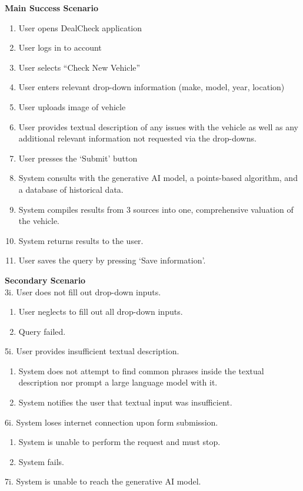 \documentclass[]{article}
\begin{document}
\begin{enumerate}[{\bf {BE}1.}]
	{\bf Main Success Scenario}
		\begin{enumerate}[1.]
			\item User opens DealCheck application
			\item User logs in to account
			\item User selects “Check New Vehicle”
			\item User enters relevant drop-down information (make, model, year, location)
			\item User uploads image of vehicle
			\item User provides textual description of any issues with the vehicle as well as any additional relevant information not requested via the drop-downs.
			\item User presses the ‘Submit’ button
			\item System consults with the generative AI model, a points-based algorithm, and a database of historical data.
			\item System compiles results from 3 sources into one, comprehensive valuation of the vehicle.
			\item System returns results to the user.
			\item User saves the query by pressing ‘Save information’.
		\end{enumerate}
		{\bf Secondary Scenario} \\
		3i. User does not fill out drop-down inputs.
		\begin{enumerate}[{3i}.1]
			\item User neglects to fill out all drop-down inputs.
			\item Query failed.
		\end{enumerate}
		5i. User provides insufficient textual description.
		\begin{enumerate}[{5i}.1]
			\item System does not attempt to find common phrases inside the textual description nor prompt a large language model with it.
			\item System notifies the user that textual input was insufficient.
		\end{enumerate}
		6i. System loses internet connection upon form submission.
		\begin{enumerate}[{6i}.1]
			\item System is unable to perform the request and must stop.
			\item System fails.
		\end{enumerate}
		7i. System is unable to reach the generative AI model.

\end{enumerate}
\end{document}
